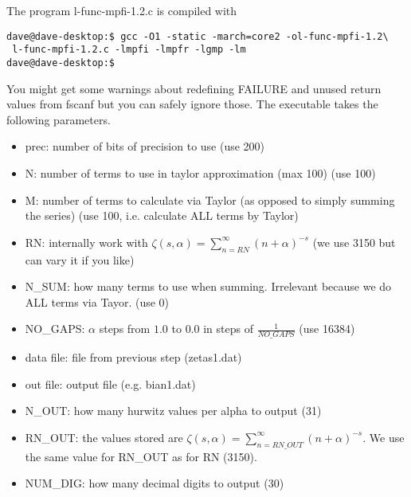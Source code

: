 \documentclass[12pt,a4paper]{article}
\begin{document}
The program l-func-mpfi-1.2.c is compiled with
\begin{verbatim}
dave@dave-desktop:$ gcc -O1 -static -march=core2 -ol-func-mpfi-1.2\
 l-func-mpfi-1.2.c -lmpfi -lmpfr -lgmp -lm
dave@dave-desktop:$
\end{verbatim}
You might get some warnings about redefining FAILURE and unused return values from fscanf but you can safely ignore those. The executable takes the following parameters.
\begin{itemize}
\item prec: number of bits of precision to use (use 200)
\item N: number of terms to use in taylor approximation (max 100) (use 100)
\item M: number of terms to calculate via Taylor (as opposed to simply summing the series) (use 100, i.e. calculate ALL terms by Taylor)
\item RN: internally work with $\zeta(s,\alpha)=\sum\limits_{n=RN}^{\infty}(n+\alpha)^{-s}$ (we use 3150 but can vary it if you like)
\item N\_SUM: how many terms to use when summing. Irrelevant because we do ALL terms via Tayor. (use 0)
\item NO\_GAPS: $\alpha$ steps from $1.0$ to $0.0$ in steps of $\frac{1}{NO\_GAPS}$ (use 16384)
\item data file: file from previous step (zetas1.dat)
\item out file: output file (e.g. bian1.dat)
\item N\_OUT: how many hurwitz values per alpha to output (31)
\item RN\_OUT: the values stored are $\zeta(s,\alpha)=\sum\limits_{n=RN\_OUT}^{\infty}(n+\alpha)^{-s}$. We use the same value for RN\_OUT as for RN (3150).
\item NUM\_DIG: how many decimal digits to output (30)
\end{itemize}
\end{document}

